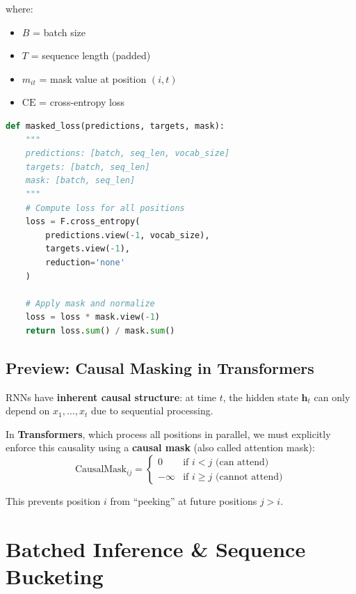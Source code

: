 \documentclass{article}
\begin{document}
where:
\begin{itemize}
\item $B$ = batch size
\item $T$ = sequence length (padded)
\item $m_{it}$ = mask value at position $(i,t)$
\item $\text{CE}$ = cross-entropy loss
\end{itemize}

\begin{lstlisting}[language=Python, caption=Masked Loss in PyTorch]
def masked_loss(predictions, targets, mask):
    """
    predictions: [batch, seq_len, vocab_size]
    targets: [batch, seq_len]
    mask: [batch, seq_len]
    """
    # Compute loss for all positions
    loss = F.cross_entropy(
        predictions.view(-1, vocab_size),
        targets.view(-1),
        reduction='none'
    )
    
    # Apply mask and normalize
    loss = loss * mask.view(-1)
    return loss.sum() / mask.sum()
\end{lstlisting}

\subsection{Preview: Causal Masking in Transformers}

\begin{tcolorbox}[colback=yellow!5!white, colframe=orange!50!black, title=Looking Ahead]
RNNs have \textbf{inherent causal structure}: at time $t$, the hidden state $\mathbf{h}_t$ can only depend on $x_1, \ldots, x_t$ due to sequential processing.

In \textbf{Transformers}, which process all positions in parallel, we must explicitly enforce this causality using a \textbf{causal mask} (also called attention mask):
\[
\text{CausalMask}_{ij} = \begin{cases}
0 & \text{if } i < j \text{ (can attend)} \\
-\infty & \text{if } i \geq j \text{ (cannot attend)}
\end{cases}
\]

This prevents position $i$ from ``peeking'' at future positions $j > i$.
\end{tcolorbox}

\section{Batched Inference \& Sequence Bucketing}
\end{document}
